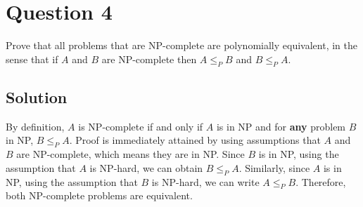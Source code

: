 
\section*{Question 4}

Prove that all problems that are NP-complete are polynomially equivalent, in the sense that if $A$ and $B$ are NP-complete then $A \leq_P B$ and $B \leq_P A$.

\subsection*{Solution}

By definition, $A$ is NP-complete if and only if $A$ is in NP and for \textbf{any} problem $B$ in NP, $B\leq_P A$.
Proof is immediately attained by using assumptions that $A$ and $B$ are NP-complete, which means they are in NP.
Since $B$ is in NP, using the assumption that $A$ is NP-hard, we can obtain $B \leq_P A$.
Similarly, since $A$ is in NP, using the assumption that $B$ is NP-hard, we can write $A \leq_P B$.
Therefore, both NP-complete problems are equivalent.

